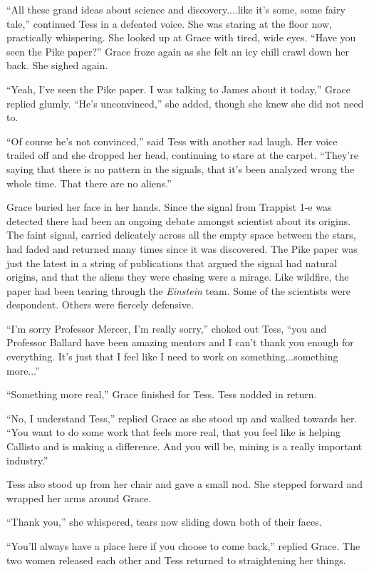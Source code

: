 \documentclass[12pt]{article} %
\begin{document}
``All these grand ideas about science and discovery....like it's some, some fairy tale,'' continued Tess in a defeated voice. She was staring at the floor now, practically whispering. She looked up at Grace with tired, wide eyes. ``Have you seen the Pike paper?'' Grace froze again as she felt an icy chill crawl down her back. She sighed again.

``Yeah, I've seen the Pike paper. I was talking to James about it today,'' Grace replied glumly. ``He's unconvinced,'' she added, though she knew she did not need to.

``Of course he's not convinced,'' said Tess with another sad laugh. Her voice trailed off and she dropped her head, continuing to stare at the carpet. ``They're saying that there is no pattern in the signals, that it's been analyzed wrong the whole time. That there are no aliens.'' 

Grace buried her face in her hands. Since the signal from Trappist 1-e was detected there had been an ongoing debate amongst scientist about its origins. The faint signal, carried delicately across all the empty space between the stars, had faded and returned many times since it was discovered. The Pike paper was just the latest in a string of publications that argued the signal had natural origins, and that the aliens they were chasing were a mirage. Like wildfire, the paper had been tearing through the \textit{Einstein} team. Some of the scientists were despondent. Others were fiercely defensive.

``I'm sorry Professor Mercer, I'm really sorry,'' choked out Tess, ``you and Professor Ballard have been amazing mentors and I can't thank you enough for everything. It's just that I feel like I need to work on something...something more...''

``Something more real,'' Grace finished for Tess. Tess nodded in return.

``No, I understand Tess,'' replied Grace as she stood up and walked towards her. ``You want to do some work that feels more real, that you feel like is helping Callisto and is making a difference. And you will be, mining is a really important industry.''

Tess also stood up from her chair and gave a small nod. She stepped forward and wrapped her arms around Grace.

``Thank you,'' she whispered, tears now sliding down both of their faces.

``You'll always have a place here if you choose to come back,'' replied Grace. The two women released each other and Tess returned to straightening her things. 
\end{document}
